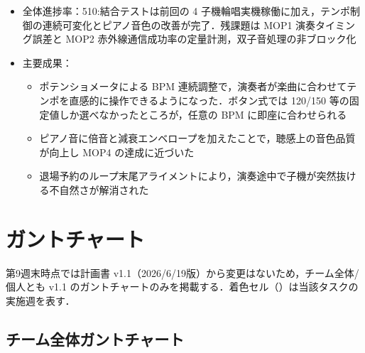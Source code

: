 \documentclass[a4paper,11pt]{ltjsarticle}
\providecommand{\％}{\%}
\begin{document}
\begin{itemize}
\begin{itemize}
    \end{itemize}
    \item 全体進捗率：510:結合テストは前回の 4 子機輪唱実機稼働に加え，テンポ制御の連続可変化とピアノ音色の改善が完了．残課題は MOP1 演奏タイミング誤差と MOP2 赤外線通信成功率の定量計測，双子音処理の非ブロック化
    \item 主要成果：
    \begin{itemize}
        \item ポテンショメータによる BPM 連続調整で，演奏者が楽曲に合わせてテンポを直感的に操作できるようになった．ボタン式では 120/150 等の固定値しか選べなかったところが，任意の BPM に即座に合わせられる
        \item ピアノ音に倍音と減衰エンベロープを加えたことで，聴感上の音色品質が向上し MOP4 の達成に近づいた
        \item 退場予約のループ末尾アライメントにより，演奏途中で子機が突然抜ける不自然さが解消された
    \end{itemize}
\end{itemize}

\section{ガントチャート}\label{sec:gantt}

第9週末時点では計画書 v1.1（2026/6/19版）から変更はないため，チーム全体/個人とも v1.1 のガントチャートのみを掲載する．着色セル（\colorbox{ganttCell}{\phantom{xx}}）は当該タスクの実施週を表す．

\renewcommand{\arraystretch}{1.3}

\begingroup
\setlength{\tabcolsep}{3pt}

\subsection{チーム全体ガントチャート}\label{sec:gantt-team}
\end{document}
